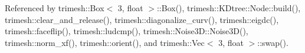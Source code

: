 Referenced by trimesh\+::\+Box$<$ 3, float $>$\+::\+Box(), trimesh\+::\+K\+Dtree\+::\+Node\+::build(), trimesh\+::clear\+\_\+and\+\_\+release(), trimesh\+::diagonalize\+\_\+curv(), trimesh\+::eigdc(), trimesh\+::faceflip(), trimesh\+::ludcmp(), trimesh\+::\+Noise3\+D\+::\+Noise3\+D(), trimesh\+::norm\+\_\+xf(), trimesh\+::orient(), and trimesh\+::\+Vec$<$ 3, float $>$\+::swap().

